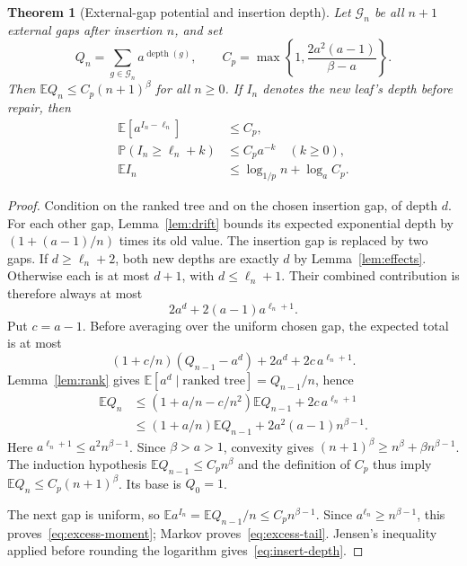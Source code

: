 \documentclass[11pt]{article}
\newtheorem{theorem}{Theorem}[section]
\newcommand{\E}{\mathbb E}
\newcommand{\Prob}{\mathbb P}
\begin{document}
\begin{theorem}[External-gap potential and insertion depth]\label{thm:random-potential}
Let $\mathcal G_n$ be all $n+1$ external gaps after insertion $n$, and set
\[
 Q_n=\sum_{g\in\mathcal G_n}a^{\operatorname{depth}(g)},\qquad
 C_p=\max\left\{1,\frac{2a^2(a-1)}{\beta-a}\right\}.
\]
Then $\E Q_n\le C_p(n+1)^\beta$ for all $n\ge0$.
If $I_n$ denotes the new leaf's depth \emph{before} repair, then
\begin{align}
 \E[a^{I_n-\ell_n}]&\le C_p,\label{eq:excess-moment}\\
 \Prob(I_n\ge\ell_n+k)&\le C_p a^{-k}\quad(k\ge0),\label{eq:excess-tail}\\
 \E I_n&\le\log_{1/p}n+\log_a C_p.\label{eq:insert-depth}
\end{align}
\end{theorem}
\begin{proof}
Condition on the ranked tree and on the chosen insertion gap, of depth $d$.
For each other gap, Lemma~\ref{lem:drift} bounds its expected exponential depth
by $(1+(a-1)/n)$ times its old value. The insertion gap is replaced by two gaps.
If $d\ge\ell_n+2$, both new depths are exactly $d$ by Lemma~\ref{lem:effects}.
Otherwise each is at most $d+1$, with $d\le\ell_n+1$. Their combined
contribution is therefore always at most
\[
 2a^d+2(a-1)a^{\ell_n+1}.
\]
Put $c=a-1$. Before averaging over the uniform chosen gap, the expected total
is at most
\[
 (1+c/n)(Q_{n-1}-a^d)+2a^d+2c\,a^{\ell_n+1}.
\]
Lemma~\ref{lem:rank} gives $\E[a^d\mid\text{ranked tree}]=Q_{n-1}/n$, hence
\begin{align*}
 \E Q_n
 &\le(1+a/n-c/n^2)\E Q_{n-1}+2c\,a^{\ell_n+1}\\
 &\le(1+a/n)\E Q_{n-1}+2a^2(a-1)n^{\beta-1}.
\end{align*}
Here $a^{\ell_n+1}\le a^2 n^{\beta-1}$. Since $\beta>a>1$, convexity gives
$(n+1)^\beta\ge n^\beta+\beta n^{\beta-1}$. The induction hypothesis
$\E Q_{n-1}\le C_p n^\beta$ and the definition of $C_p$ thus imply
$\E Q_n\le C_p(n+1)^\beta$. Its base is $Q_0=1$.

The next gap is uniform, so
$\E a^{I_n}=\E Q_{n-1}/n\le C_p n^{\beta-1}$.
Since $a^{\ell_n}\ge n^{\beta-1}$, this proves~\eqref{eq:excess-moment};
Markov proves~\eqref{eq:excess-tail}. Jensen's inequality applied before
rounding the logarithm gives~\eqref{eq:insert-depth}.
\end{proof}
\end{document}
